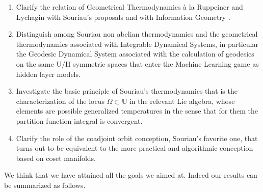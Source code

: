 \documentclass[10pt,a4paper]{article}
\begin{document}
\begin{enumerate}
  \item Clarify the relation of  Geometrical Thermodynamics {\`a} la Ruppeiner \cite{Ruppeiner_2010,Ruppeiner_2012,Ruppeiner_2012b,Ruppeiner_2013,ruppoRdiag,Ruppeiner_2020} and Lychagin  \cite{lychaginlecture} with Souriau's proposals\cite{marlentropia,marlegibbs} and with Information Geometry
      \cite{Nielsen_2020}.
  \item Distinguish among Souriau non abelian thermodynamics and the geometrical thermodynamics associated with Integrable Dynamical Systems, in particular the Geodesic Dynamical System associated with the calculation of geodesics on the same $\mathrm{U/H}$ symmetric spaces that enter the Machine Learning game as hidden layer models.
  \item Investigate the basic principle of Souriau's thermodynamics that is the characterization of the locus $\Omega \subset \mathbb{U}$ in the relevant Lie algebra, whose elements are possible generalized temperatures in the sense that for them the partition function integral is convergent.
  \item Clarify the role of the coadjoint orbit conception, Souriau's favorite one, that turns out to be equivalent to the more practical and algorithmic conception based on coset manifolds.
\end{enumerate}
We think that we have attained  all the goals we aimed at. Indeed our results can be summarized as follows.
\end{document}
